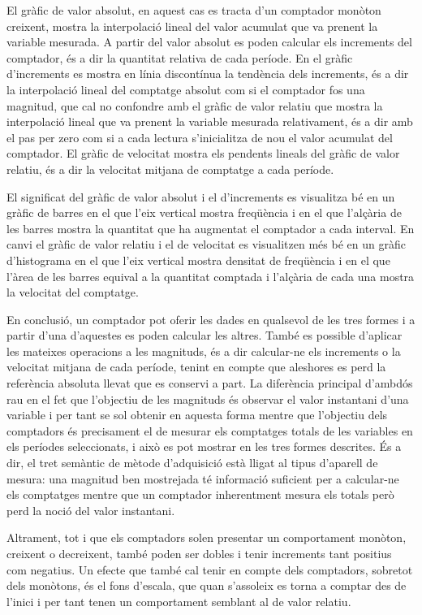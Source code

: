 El gràfic de valor absolut, en aquest cas es tracta d'un comptador
monòton creixent, mostra la interpolació lineal del valor acumulat que
va prenent la variable mesurada. A partir del valor absolut es poden
calcular els increments del comptador, és a dir la quantitat relativa
de cada període. En el gràfic d'increments es mostra en línia
discontínua la tendència dels increments, és a dir la interpolació
lineal del comptatge absolut com si el comptador fos una
magnitud, que cal no confondre amb el gràfic de valor relatiu que
mostra la interpolació lineal que va prenent la variable mesurada
relativament, és a dir amb el pas per zero com si a cada lectura
s'inicialitza de nou el valor acumulat del comptador. El gràfic de
velocitat mostra els pendents lineals del gràfic de valor relatiu, és
a dir la velocitat mitjana de comptatge a cada període.

El significat del gràfic de valor absolut i el d'increments es
visualitza bé en un gràfic de barres en el que l'eix vertical mostra
freqüència i en el que l'alçària de les barres mostra la quantitat que
ha augmentat el comptador a cada interval. En canvi el gràfic de valor
relatiu i el de velocitat es visualitzen més bé en un gràfic
d'histograma en el que l'eix vertical mostra densitat de freqüència i en el
que l'àrea de les barres equival a la quantitat comptada i l'alçària
de cada una mostra la velocitat del comptatge.


En conclusió, un comptador pot oferir les dades en qualsevol de les
tres formes i a partir d'una d'aquestes es poden calcular les
altres. També es possible d'aplicar les mateixes operacions a les
magnituds, és a dir calcular-ne els increments o la velocitat mitjana
de cada període, tenint en compte que aleshores es perd la referència
absoluta llevat que es conservi a part. La diferència principal
d'ambdós rau en el fet que l'objectiu de les magnituds és observar el
valor instantani d'una variable i per tant se sol obtenir en aquesta
forma mentre que l'objectiu dels comptadors és precisament el de
mesurar els comptatges totals de les variables en els períodes
seleccionats, i això es pot mostrar en les tres formes descrites. És a
dir, el tret semàntic de mètode d'adquisició està lligat al tipus
d'aparell de mesura: una magnitud ben mostrejada té informació
suficient per a calcular-ne els comptatges mentre que un comptador
inherentment mesura els totals però perd la noció del valor
instantani.

Altrament, tot i que els comptadors solen presentar un comportament
monòton, creixent o decreixent, també poden ser dobles i tenir
increments tant positius com negatius. Un efecte que també cal tenir
en compte dels comptadors, sobretot dels monòtons, és el fons
d'escala, que quan s'assoleix es torna a comptar des de l'inici i per
tant tenen un comportament semblant al de valor relatiu.

